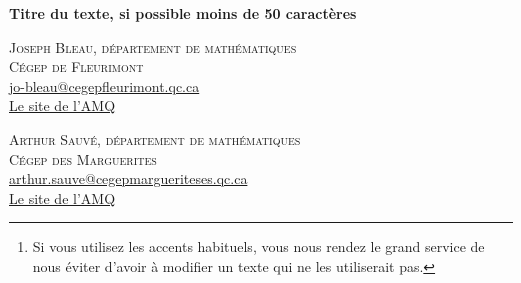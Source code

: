 \documentclass[10pt]{article}
\newcommand{\siecle}[1]{%
\ifnum #1=1%
\uppercase\expandafter{\romannumeral #1}\textsuperscript{er}%
\else%
\uppercase\expandafter{\romannumeral #1}\up{e}%
\fi}
\begin{document}


\renewcommand{\tablename}{\textsc{Tableau}}

\begin{center}
\textsf{\LARGE \textbf{Titre du texte, si possible moins de 50 caractères}}
\end{center}

\begin{flushright}
\textsc{Joseph Bleau, département de mathématiques} \\
\textsc{Cégep de Fleurimont} \\
\href{mailto:jo-bleau@cegepfleurimont.qc.ca}{jo-bleau@cegepfleurimont.qc.ca} \\
\href{https://www.amq.math.ca/}{Le site de l'AMQ}
\end{flushright}

\begin{flushright}
\textsc{Arthur Sauvé, département de mathématiques} \\
\textsc{Cégep des Marguerites} \\
\href{mailto:arthur.sauve@cegepmargueriteses.qc.ca}{arthur.sauve@cegepmargueriteses.qc.ca} \\
\href{https://www.amq.math.ca/}{Le site de l'AMQ}
\end{flushright}

\baselineskip


\begin{abstract}

Dans ce Gabarit, on devra entrer tous les textes en caractères
accentués, comme à
l'habitude\footnote{Si vous utilisez les accents habituels, vous nous rendez le grand service de nous éviter d'avoir à modifier un texte qui ne les utiliserait pas.}.
Le résumé apparaît ici. Long d'au maximum 100 mots, il peut contenir des
expressions en \emph{italique}, en \textbf{caractères gras} ou en
\textsc{petites capitales}. On peut aussi utiliser des symboles
particuliers comme \(\Bbb{R}\), \(\mathscr{F}\) ou encore
\(\mathscr{P}(E)\) et même des expressions mathématiques comme
\(f_k(x)=a x^2+bx+c\), ou encore à l'ensemble \(\mathfrak{F}\) des
formules du système formel \(\mathfrak{L}\) est bien défini. Il est
possible de reculer dans le temps. Ainsi, on peut parler du \siecle{1}
siècle de notre ère ou des \siecle{20} et \siecle{21} siècles.

\end{abstract}
\end{document}
